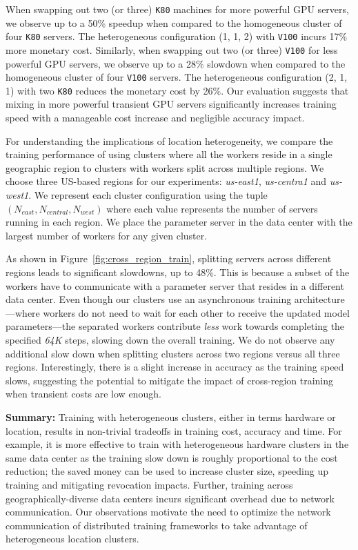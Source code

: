 When swapping out two (or three) \texttt{K80} machines for more powerful GPU
servers, we observe up to a 50\% speedup when compared to the homogeneous
cluster of four \texttt{K80} servers.  The heterogeneous configuration (1, 1,
2) with \texttt{V100} incurs 17\% more monetary cost.  Similarly, when swapping
out two (or three) \texttt{V100} for less powerful GPU servers, we observe up
to a 28\% slowdown when compared to the homogeneous cluster of four
\texttt{V100} servers. The heterogeneous configuration (2, 1, 1) with two
\texttt{K80}  reduces the monetary cost by 26\%. Our evaluation suggests that
mixing in more powerful transient GPU servers significantly increases training
speed  with a manageable cost increase and negligible accuracy impact. 

 
For understanding the implications of location heterogeneity, we compare the
training performance of using clusters where all the workers reside in a single
geographic region to clusters with workers split across multiple regions.  We
choose three US-based regions for our experiments: \emph{us-east1},
\emph{us-centra1} and \emph{us-west1}. We represent each  cluster configuration
using the tuple $(N_{east}, N_{central}, N_{west})$ where each value represents
the  number of servers running in each region.  We place the  parameter server in
the data center with the largest number of workers for any given cluster.  

As shown in Figure~\ref{fig:cross_region_train}, splitting servers across
different regions leads to significant slowdowns, up to 48\%.  This is because
a subset of the workers have to communicate with a parameter server that
resides in a different data center.  Even though our clusters use an
asynchronous training architecture---where workers do not need to wait for each other
to receive the updated model parameters---the separated workers contribute \emph{less}
work towards completing the specified \emph{64K} steps, slowing down the
overall training.  We do not observe any additional slow down when splitting
clusters across two regions versus all three regions.  Interestingly, there is
a slight increase in accuracy as the training speed slows, suggesting the
potential to mitigate the impact of cross-region training when transient costs are
low enough. 


\textbf{Summary:} Training with heterogeneous clusters, either in terms
hardware or location, results in non-trivial tradeoffs in training cost, accuracy and
time. For example,  it is more effective to  train  with heterogeneous hardware
clusters in the same data center as the training slow down is roughly
proportional to the cost reduction; the saved money can be used to increase
cluster size, speeding up training and mitigating revocation impacts.
Further, training across geographically-diverse data centers incurs significant
overhead due to network communication.  Our observations motivate the need to
optimize the network communication of distributed training frameworks to 
take advantage of heterogeneous location clusters.  
 

